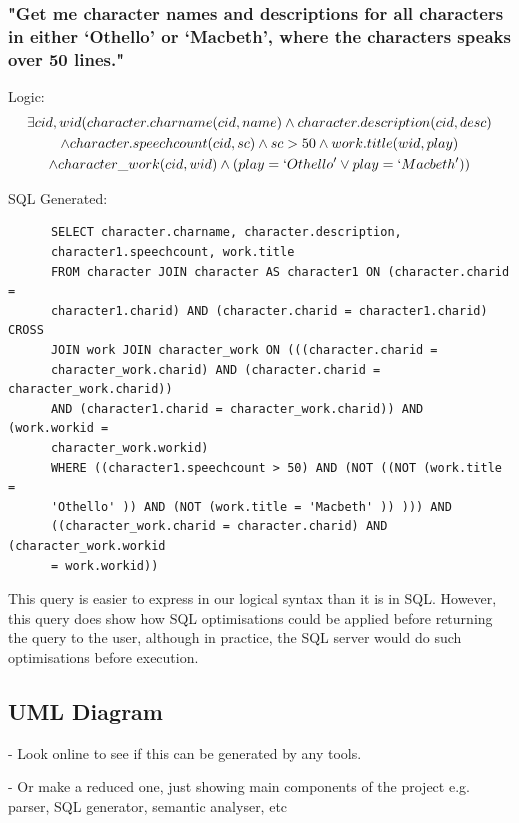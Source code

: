 \documentclass[a4paper, 11pt]{article}
\begin{document}
      \subsubsection*{"Get me character names and descriptions for all
        characters in either `Othello' or `Macbeth', where the characters
      speaks over 50 lines."}

      Logic:
      \begin{multline}
        \exists cid,wid(character.charname(cid, name) \land character.description(cid,
        desc) \\
        \land character.speechcount(cid, sc) \land sc > 50 
        \land work.title(wid, play) 
        \\ \land character\_work(cid, wid) \land (play = `Othello' 
        \lor play = `Macbeth'))
      \end{multline}

      SQL Generated:
      \begin{verbatim}
      SELECT character.charname, character.description,
      character1.speechcount, work.title
      FROM character JOIN character AS character1 ON (character.charid =
      character1.charid) AND (character.charid = character1.charid) CROSS
      JOIN work JOIN character_work ON (((character.charid =
      character_work.charid) AND (character.charid = character_work.charid))
      AND (character1.charid = character_work.charid)) AND (work.workid =
      character_work.workid)
      WHERE ((character1.speechcount > 50) AND (NOT ((NOT (work.title =
      'Othello' )) AND (NOT (work.title = 'Macbeth' )) ))) AND
      ((character_work.charid = character.charid) AND (character_work.workid
      = work.workid))
      \end{verbatim}

      This query is easier to express in our logical syntax than it is in SQL.
      However, this query does show how SQL optimisations could be applied
      before returning the query to the user, although in practice, the SQL
      server would do such optimisations before execution.

  \subsection{UML Diagram}

  - Look online to see if this can be generated by any tools.

  - Or make a reduced one, just showing main components of the project e.g.
  parser, SQL generator, semantic analyser, etc
\end{document}
